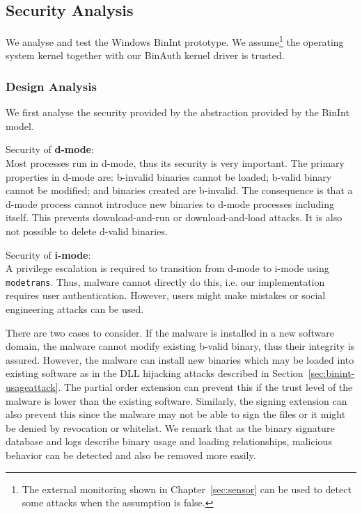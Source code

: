 \subsection{Security Analysis}
\label{sec:binint-secanal}

We analyse and test the Windows BinInt prototype.
We assume\footnote{
The external monitoring shown in Chapter~\ref{sec:sensor}
can be used to detect some attacks when the assumption is false.}
the operating system kernel together with our BinAuth
kernel driver is trusted.

\subsubsection{Design Analysis}

We first analyse the security provided by the abstraction
provided by the BinInt model.
\medskip

\noindent
Security of {\bf d-mode}: \\
Most processes run in d-mode, thus its security is very
important.
The primary properties in d-mode are: 
b-invalid binaries cannot be loaded; b-valid binary
cannot be modified; and binaries created are b-invalid.
The consequence is that a d-mode process cannot introduce new
binaries to d-mode processes including itself.
This prevents download-and-run or download-and-load attacks.
It is also not possible to delete d-valid binaries.
\medskip

\noindent
Security of {\bf i-mode}: \\
A privilege escalation is required to transition from d-mode to i-mode
using {\tt modetrans}. Thus, malware cannot directly do this, i.e.
our implementation requires user authentication.
However, users might make mistakes or social engineering attacks can
be used.

There are two cases to consider.
If the malware is installed in a new software domain,
the malware cannot modify existing b-valid binary,
thus their integrity is assured.
However, the malware can install new binaries which may be loaded
into existing software as in the DLL hijacking attacks described
in Section~\ref{sec:binint-usageattack}.
The partial order extension can prevent this if the trust level
of the malware is lower than the existing software.
Similarly, the signing extension can also prevent this since the 
malware may not be able to sign the files or it might be denied by
revocation or whitelist.
We remark that as the binary signature database and logs describe
binary usage and loading relationships, malicious behavior can
be detected and also be removed more easily.

